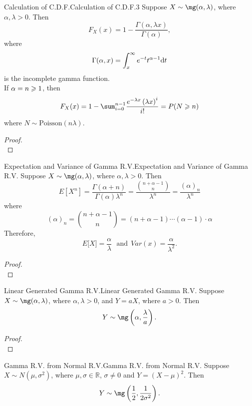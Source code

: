 \documentclass{elegantbook}
\begin{document}
\begin{theorem}{Calculation of C.D.F.}{Calculation of C.D.F.3}
Suppose $X\sim\mg(\alpha,\lambda)$, where $\alpha,\lambda>0$. Then
$$
F_X(x)=1-\frac{{\Gamma}(\alpha,\lambda x)}{{\Gamma}(\alpha)},
$$
where
$$
{\Gamma}(\alpha,x)=\int_{x}^{\infty}{e^{-t}t^{\alpha-1}\dif t}
$$
is the incomplete gamma function.\\
If $\alpha=n\geqslant1$, then
$$
F_X(x)=1-\sum_{i=0}^{n-1}\frac{e^{-\lambda x}\left(\lambda x\right)^i}{i!}=P(N\gs n)
$$
where $N\sim\mathrm{Poisson}(n\lambda)$.
\end{theorem}

\begin{proof}
\\[4cm]\vspace{0.01cm}
\end{proof}

\begin{theorem}{Expectation and Variance of Gamma R.V.}{Expectation and Variance of Gamma R.V.}
Suppose $X\sim\mg(\alpha,\lambda)$, where $\alpha,\lambda>0$. Then
$$
E\left[X^n\right]=\frac{{\Gamma}(\alpha+n)}{{\Gamma}(\alpha)\lambda^n}=\frac{\binom{n+\alpha-1}{n}}{\lambda^n}=\frac{{(\alpha)}_n}{\lambda^n}
$$
where
$$
{(\alpha)}_n=\binom{n+\alpha-1}{n}=\left(n+\alpha-1\right)\cdots\left(\alpha-1\right)\cdot\alpha
$$
Therefore,
\[E\lbrack X\rbrack = \frac{\alpha}{\lambda}\text{\ \ }\mathrm{\text{and}}\mathrm{\ }\ Var(x) = \frac{\alpha}{\lambda^{2}}.
\]
\end{theorem}

\begin{proof}
\\[4cm]\vspace{0.01cm}
\end{proof}

\begin{theorem}{Linear Generated Gamma R.V.}{Linear Generated Gamma R.V.}
Suppose $X\sim\mg(\alpha,\lambda)$, where $\alpha,\lambda>0$, and $Y=aX$, where $a>0$. Then
\[Y\sim\mg\left( \alpha,\frac{\lambda}{a} \right).\]
\end{theorem}

\begin{proof}
\\[4cm]\vspace{0.01cm}
\end{proof}

\begin{theorem}{Gamma R.V. from Normal R.V.}{Gamma R.V. from Normal R.V.}
Suppose $X\sim N(\mu,\sigma^2)$, where $\mu,\sigma\in\mathbb{R}$, $\sigma\neq0$ and $Y={(X-\mu)}^2$. Then
\[Y\sim\mg\left( \frac{1}{2},\frac{1}{2\sigma^{2}} \right).\]
\end{theorem}
\end{document}
